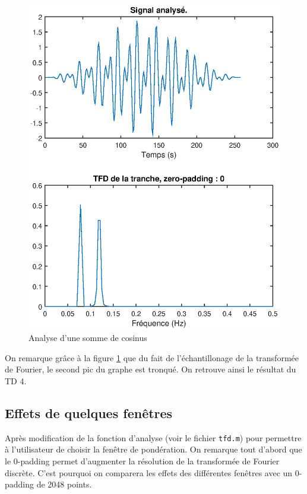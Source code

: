 \documentclass[french]{article}
\begin{document}
\begin{figure}[h!]
\begin{minipage}{0.45\textwidth}
		\includegraphics[width=\textwidth]{images/hanning_sans_0p.eps}
		\caption{Analyse d'une somme de cosinus}
		\label{fig:hanning_sans_0p}
	\end{minipage}
\end{figure}

On remarque grâce à la figure \ref{fig:hanning_sans_0p} que du fait de l'échantillonage de la transformée de Fourier, le second pic du graphe est tronqué. On retrouve ainsi le résultat du TD 4.

\subsection{Effets de quelques fenêtres}

Après modification de la fonction d'analyse (voir le fichier \verb`tfd.m`) pour permettre à l'utilisateur de choisir la fenêtre de pondération. On remarque tout d'abord que le 0-padding permet d'augmenter la résolution de la transformée de Fourier discrète. C'est pourquoi on comparera les effets des différentes fenêtres avec un 0-padding de 2048 points.
\end{document}

